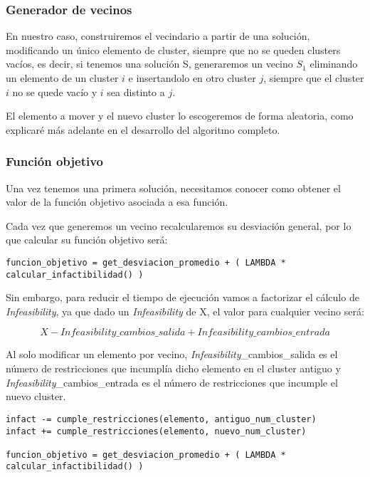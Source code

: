 \documentclass[12pt, spanish]{article}
\begin{document}
 
\subsubsection{Generador de vecinos}

En nuestro caso, construiremos el vecindario a partir de una solución, modificando un único elemento de cluster, siempre que no se queden clusters vacíos, es decir, si tenemos una solución S, generaremos un vecino $S_1$ eliminando un elemento de un cluster $i$ e insertandolo en otro cluster $j$, siempre que el cluster $i$ no se quede vacío y $i$ sea distinto a $j$.

El elemento a mover y el nuevo cluster lo escogeremos de forma aleatoria, como explicaré más adelante en el desarrollo del algoritmo completo.

 
\subsubsection{Función objetivo} 
 
Una vez tenemos una primera solución, necesitamos conocer como obtener el valor de la función objetivo asociada a esa función.

Cada vez que generemos un vecino recalcularemos su desviación general, por lo que calcular su función objetivo será:

\begin{lstlisting}
funcion_objetivo = get_desviacion_promedio + ( LAMBDA * calcular_infactibilidad() )
 \end{lstlisting}


Sin embargo, para reducir el tiempo de ejecución vamos a factorizar el cálculo de \textit{Infeasibility}, ya que dado un \textit{Infeasibility} de X, el valor para cualquier vecino será:

$$X - \textit{Infeasibility}\_cambios\_salida + \textit{Infeasibility}\_cambios\_entrada$$
 
 Al solo modificar un elemento por vecino, \textit{Infeasibility}\_cambios\_salida  es el número de restricciones que incumplía dicho elemento en el cluster antiguo y \textit{Infeasibility}\_cambios\_entrada es el número de restricciones que incumple el nuevo cluster.
 
 
 
\begin{lstlisting}
infact -= cumple_restricciones(elemento, antiguo_num_cluster)
infact += cumple_restricciones(elemento, nuevo_num_cluster)

funcion_objetivo = get_desviacion_promedio + ( LAMBDA * calcular_infactibilidad() )
 \end{lstlisting}
\end{document}
